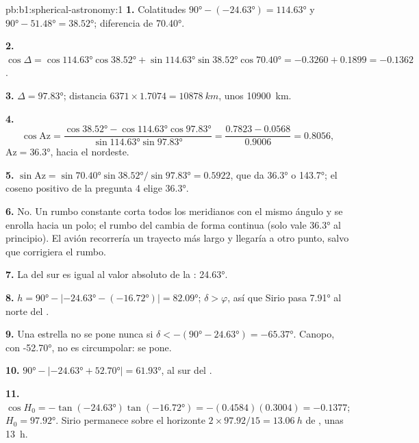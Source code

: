 \begin{solution}{pb:b1:spherical-astronomy:1}
\textbf{1.} Colatitudes $\ang{90} - (\ang{-24.63}) = \ang{114.63}$ y
$\ang{90} - \ang{51.48} = \ang{38.52}$; diferencia de  \ang{70.40}.

\textbf{2.} $\cos\Delta = \cos\ang{114.63}\cos\ang{38.52} +
\sin\ang{114.63}\sin\ang{38.52}\cos\ang{70.40} = -0.3260 + 0.1899 =
-0.1362$.

\textbf{3.} $\Delta = \ang{97.83}$; distancia $6371\times1.7074 =
\qty{10878}{km}$, unos \qty{10900}{km}.

\textbf{4.}
\[
  \cos\mathrm{Az} = \frac{\cos\ang{38.52} - \cos\ang{114.63}\cos\ang{97.83}}
  {\sin\ang{114.63}\sin\ang{97.83}} = \frac{0.7823 - 0.0568}{0.9006} = 0.8056 ,
\]
$\mathrm{Az} = \ang{36.3}$, hacia el nordeste.

\textbf{5.} $\sin\mathrm{Az} = \sin\ang{70.40}\sin\ang{38.52}/\sin\ang{97.83}
= 0.5922$, que da \ang{36.3} o \ang{143.7}; el coseno positivo de la pregunta 4
elige \ang{36.3}.

\textbf{6.} No. Un rumbo constante corta todos los meridianos con el mismo ángulo y
se enrolla hacia un polo; el rumbo del  cambia de forma continua (solo
vale \ang{36.3} al principio). El avión recorrería un trayecto más largo y llegaría
a otro punto, salvo que corrigiera el rumbo.

\textbf{7.} La  del  sur es igual al valor absoluto de la :
\ang{24.63}.

\textbf{8.} $h = \ang{90} - |\ang{-24.63} - (\ang{-16.72})| = \ang{82.09}$;
$\delta > \varphi$, así que Sirio pasa \ang{7.91} al norte del .

\textbf{9.} Una estrella no se pone nunca si $\delta < -(\ang{90} - \ang{24.63}) =
\ang{-65.37}$. Canopo, con \ang{-52.70}, no es circumpolar: se pone.

\textbf{10.} $\ang{90} - |\ang{-24.63} + \ang{52.70}| = \ang{61.93}$, al sur del
.

\textbf{11.} $\cos H_0 = -\tan(\ang{-24.63})\tan(\ang{-16.72}) =
-(0.4584)(0.3004) = -0.1377$; $H_0 = \ang{97.92}$. Sirio permanece sobre el
horizonte $2\times97.92/15 = \qty{13.06}{h}$ de , unas \qty{13}{h}.


\end{solution}

